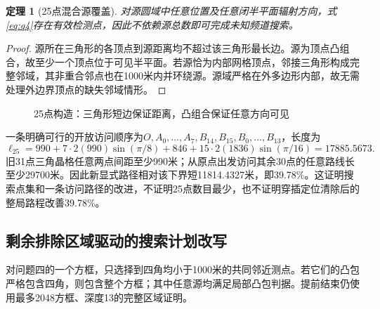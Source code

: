 \documentclass[UTF8,a4paper,zihao=-4,fontset=windows]{ctexart}
\newtheorem{theorem}{定理}[section]
\begin{document}
\begin{theorem}[25点混合源覆盖]\label{thm:25}
对源圆域中任意位置及任意闭半平面辐射方向，式\eqref{eq:q4}存在有效检测点，因此不依赖源总数即可完成未知频道搜索。
\end{theorem}
\begin{proof}
源所在三角形的各顶点到源距离均不超过该三角形最长边。源为顶点凸组合，故至少一个顶点位于可见半平面。若源恰为内部网格顶点，邻接三角形构成完整邻域，其非重合邻点也在1000米内并环绕源。源域严格在外多边形内部，故无需处理外边界顶点的缺失邻域情形。
\end{proof}

\begin{figure}[htbp]\centering
{}
\caption{25点构造：三角形短边保证距离，凸组合保证任意方向可见}
\end{figure}

一条明确可行的开放访问顺序为$O,A_0,\ldots,A_7,B_{14},B_{15},B_0,\ldots,B_{13}$，长度为
\begin{equation}\label{eq:searchlength}
\ell_{25}=990+7\cdot2(990)\sin(\pi/8)+846
+15\cdot2(1836)\sin(\pi/16)=17885.5673.
\end{equation}
旧31点三角晶格任意两点间距至少990米；从原点出发访问其余30点的任意路线长至少29700米。因此新显式路径相对该下界短11814.4327米，即39.78\%。这证明搜索点集和一条访问路径的改进，不证明25点数目最少，也不证明穿插定位清除后的整局路程改善39.78\%。

\subsection{剩余排除区域驱动的搜索计划改写}
对问题四的一个方框，只选择到四角均小于1000米的共同邻近测点。若它们的凸包严格包含四角，则包含整个方框；其中任意源均满足局部凸包判据。提前结束仍使用最多2048方框、深度13的完整区域证明。
\end{document}
